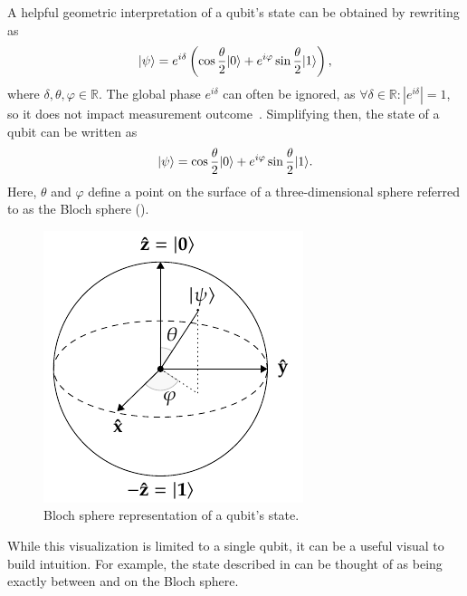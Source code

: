 A helpful geometric interpretation of a qubit's state can be obtained by rewriting  as
\begin{equation}
\vert{\psi}\rangle = e^{i\delta} \left(\cos\dfrac{\theta}{2}\vert{0}\rangle + e^{i\varphi}\sin\dfrac{\theta}{2}\vert{1}\rangle\right),
\end{equation}
where $\delta, \theta, \varphi \in \mathbb{R}$.
The global phase $e^{i\delta}$ can often be ignored, as $\forall \delta \in \mathbb{R} : |e^{i\delta}| = 1$, so it does not impact measurement outcome~\cite{nielsen2002quantum}.
Simplifying then, the state of a qubit can be written as
\begin{equation}
\vert{\psi}\rangle = \cos\dfrac{\theta}{2}\vert{0}\rangle + e^{i\varphi}\sin\dfrac{\theta}{2}\vert{1}\rangle.
\end{equation}
Here, $\theta$ and $\varphi$ define a point on the surface of a three-dimensional sphere referred to as the Bloch sphere ().
\begin{figure}[ht]
    \centering
    \includegraphics[width=0.33\linewidth]{figures/bloch-sphere.pdf}
    \caption[Bloch sphere representation of a qubit's state.]{Bloch sphere representation of a qubit's state.}
    \label{fig:bloch-sphere}
\end{figure}
While this visualization is limited to a single qubit, it can be a useful visual to build intuition.
For example, the \ket{+} state described in  can be thought of as being exactly between  and  on the Bloch sphere.

